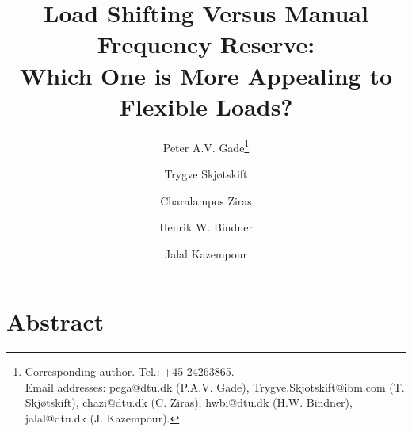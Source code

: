 \documentclass[11pt,a4paper]{article}
\date{}
\begin{document}
\title{
    Load Shifting Versus Manual Frequency Reserve: \\ Which One is More Appealing to Flexible Loads?
}
\author[1,2]{Peter A.V. Gade\footnote{Corresponding author. Tel.: +45 24263865. \\ Email addresses: pega@dtu.dk (P.A.V. Gade), Trygve.Skjotskift@ibm.com (T. Skjøtskift), chazi@dtu.dk (C. Ziras), hwbi@dtu.dk (H.W. Bindner), jalal@dtu.dk (J. Kazempour).}}
\author[2]{Trygve Skjøtskift}
\author[1]{Charalampos Ziras}
\author[1]{Henrik W. Bindner}
\author[1]{Jalal Kazempour}
\renewcommand\Affilfont{\itshape\small}

{\let\newpage\relax\maketitle}


\section*{Abstract}
\end{document}
